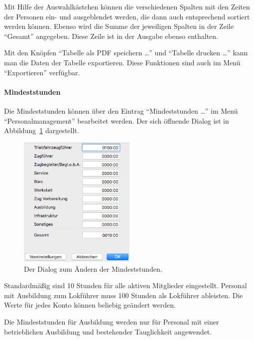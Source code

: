 Mit Hilfe der Auswahlkästchen können die verschiedenen Spalten mit den Zeiten der Personen ein- und ausgeblendet werden, die dann auch entsprechend sortiert werden können.
Ebenso wird die Summe der jeweiligen Spalten in der Zeile "`Gesamt"' angegeben.
Diese Zeile ist in der Ausgabe ebenso enthalten.


Mit den Knöpfen "`Tabelle als PDF speichern \dots"' und "`Tabelle drucken \dots"' kann man die Daten der Tabelle exportieren.
Diese Funktionen sind auch im Menü "`Exportieren"' verfügbar.


\paragraph{Mindeststunden}
Die Mindeststunden können über den Eintrag "`Mindeststunden \dots"' im Menü "`Personalmanagement"' bearbeitet werden.
Der sich öffnende Dialog ist in Abbildung~\ref{fig:personal:mindeststunden} dargestellt.

\begin{figure}[!h]
	\centering
	\includegraphics[width=0.5\textwidth]{img/personal_mindeststunden}
	\caption{Der Dialog zum Ändern der Mindeststunden.}
	\label{fig:personal:mindeststunden}
\end{figure}

Standardmäßig sind 10 Stunden für alle aktiven Mitglieder eingestellt.
Personal mit Ausbildung zum Lokführer muss 100 Stunden als Lokführer ableisten.
Die Werte für jedes Konto können beliebig geändert werden.

Die Mindeststunden für Ausbildung werden nur für Personal mit einer betrieblichen Ausbildung und bestehender Tauglichkeit angewendet.




